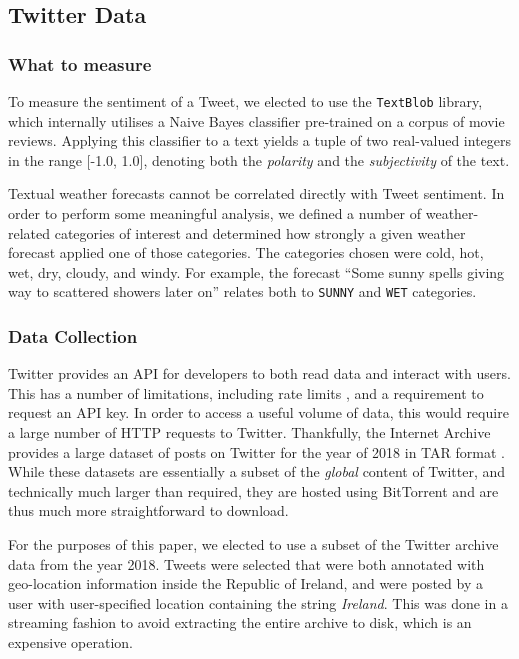 \documentclass[a4paper,10pt]{article}
\begin{document}
    \subsection{Twitter Data}

    \subsubsection{What to measure}

    To measure the sentiment of a Tweet, we elected to use the \texttt{TextBlob}  library, which internally utilises a Naive Bayes classifier pre-trained on a corpus of movie reviews. Applying this classifier to a text yields a tuple of two real-valued integers in the range [-1.0, 1.0], denoting both the \textit{polarity} and the \textit{subjectivity} of the text.

    Textual weather forecasts cannot be correlated directly with Tweet sentiment. In order to perform some meaningful analysis, we defined a number of weather-related categories of interest and determined how strongly a given weather forecast applied one of those categories. The categories chosen were cold, hot, wet, dry, cloudy, and windy. For example, the forecast ``Some sunny spells giving way to scattered showers later on'' relates both to \texttt{SUNNY} and \texttt{WET} categories.

    \subsubsection{Data Collection}

    Twitter provides an API for developers to both read data and interact with users. This has a number of limitations, including rate limits , and a requirement to request an API key. In order to access a useful volume of data, this would require a large number of HTTP requests to Twitter. Thankfully, the Internet Archive provides a large dataset of posts on Twitter for the year of 2018 in TAR format . While these datasets are essentially a subset of the \textit{global} content of Twitter, and technically much larger than required, they are hosted using BitTorrent and are thus much more straightforward to download.
    
    For the purposes of this paper, we elected to use a subset of the Twitter archive data from the year 2018. Tweets were selected that were both annotated with geo-location information inside the Republic of Ireland, and were posted by a user with user-specified location containing the string \textit{Ireland}. This was done in a streaming fashion to avoid extracting the entire archive to disk, which is an expensive operation.
\end{document}
